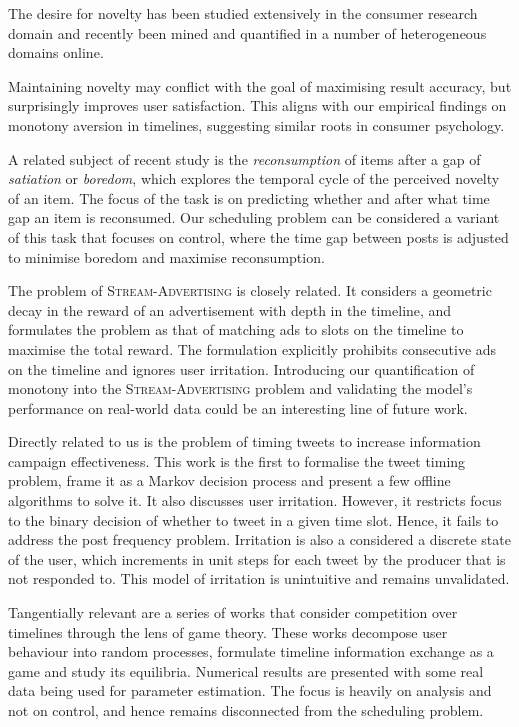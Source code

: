 \documentclass[onesided,asymmetric]{tufte-book}
\begin{document}
The desire for novelty has been studied extensively in the consumer research domain\cite{Kahn1995139} and recently been mined and quantified in a number of heterogeneous domains online\cite{Zhang:2014:MNT:2566486.2567976}.

Maintaining novelty may conflict with the goal of maximising result accuracy, but surprisingly improves user satisfaction\cite{McNee:2006:AEA:1125451.1125659}. This aligns with our empirical findings on monotony aversion in timelines, suggesting similar roots in consumer psychology.

\newpage

A related subject of recent study is the \textit{reconsumption} of items after a gap of \textit{satiation} or \textit{boredom}\cite{Kapoor:2015:JTR:2684822.2685306}\cite{Anderson:2014:DRC:2566486.2568018}, which explores the temporal cycle of the perceived novelty of an item. The focus of the task is on predicting whether and after what time gap an item is reconsumed. Our scheduling problem can be considered a variant of this task that focuses on control, where the time gap between posts is adjusted to minimise boredom and maximise reconsumption.

The problem of \textsc{Stream-Advertising}\cite{Ieong:2014:AS:2566486.2568030} is closely related. It considers a geometric decay in the reward of an advertisement with depth in the timeline, and formulates the problem as that of matching ads to slots on the timeline to maximise the total reward. The formulation explicitly prohibits consecutive ads on the timeline and ignores user irritation. Introducing our quantification of monotony into the \textsc{Stream-Advertising} problem and validating the model's performance on real-world data could be an interesting line of future work.

Directly related to us is the problem of timing tweets to increase information campaign effectiveness\cite{dabeer2011timing}. This work is the first to formalise the tweet timing problem, frame it as a Markov decision process and present a few offline algorithms to solve it. It also discusses user irritation. However, it restricts focus to the binary decision of whether to tweet in a given time slot. Hence, it fails to address the post frequency problem. Irritation is also a considered a discrete state of the user, which increments in unit steps for each tweet by the producer that is not responded to. This model of irritation is unintuitive and remains unvalidated.

Tangentially relevant are a series of works that consider competition over timelines through the lens of game theory\cite{altman2014strategic}\cite{reiffers2014game}. These works decompose user behaviour into random processes, formulate timeline information exchange as a game and study its equilibria. Numerical results are presented with some real data being used for parameter estimation. The focus is heavily on analysis and not on control, and hence remains disconnected from the scheduling problem.
\end{document}
